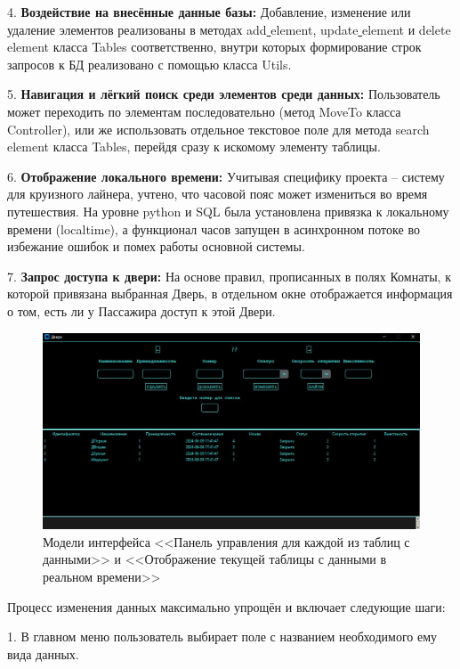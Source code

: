 4. \textbf{Воздействие на внесённые данные базы:} Добавление, изменение или удаление элементов реализованы в методах add\underline{ }element, update\underline{ }element и delete\underline{ }element класса Tables соответственно, внутри которых формирование строк запросов к БД реализовано с помощью класса Utils.

5. \textbf{Навигация и лёгкий поиск среди элементов среди данных:} Пользователь может переходить по элементам последовательно (метод MoveTo класса Controller), или же использовать отдельное текстовое поле для метода search\underline{ }element класса Tables, перейдя сразу к искомому элементу таблицы.

6. \textbf{Отображение локального времени:} Учитывая специфику проекта -- систему для круизного лайнера, учтено, что часовой пояс может измениться во время путешествия. На уровне python и SQL была установлена привязка к локальному времени (localtime), а функционал часов запущен в асинхронном потоке во избежание ошибок и помех работы основной системы.

7. \textbf{Запрос доступа к двери:} На основе правил, прописанных в полях Комнаты, к которой привязана выбранная Дверь, в отдельном окне отображается информация о том, есть ли у Пассажира доступ к этой Двери.

\begin{figure} [ht]
	\centering
	\includegraphics[width=1\linewidth]{images/Example2}
	\caption{Модели интерфейса <<Панель управления для каждой из таблиц с данными>> и <<Отображение текущей таблицы с данными в реальном времени>>}
	\label{fig:example2}
\end{figure}

Процесс изменения данных максимально упрощён и включает следующие шаги:

1. В главном меню пользователь выбирает поле с названием необходимого ему вида данных.

